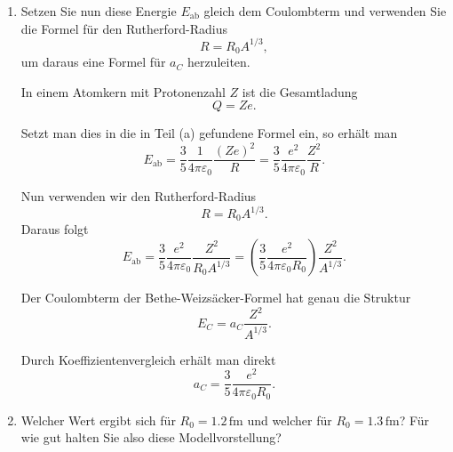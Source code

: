 \documentclass[11pt,a4paper]{scrartcl}
\begin{document}
\begin{enumerate}[label=(\alph*)]
\begin{solutionbox}
        Dies vereinfacht sich zu
        \[
            dE
            =\frac{1}{4\pi\varepsilon_0}\frac{3Q^2}{R^6}r^4\,dr.
        \]

        Nun integrieren wir von $r=0$ bis $r=R$:
        \[
            E_{\mathrm{ab}}
            =\int_0^R dE
            =\frac{3Q^2}{4\pi\varepsilon_0 R^6}\int_0^R r^4\,dr.
        \]

        Mit
        \[
            \int_0^R r^4\,dr=\frac{R^5}{5}
        \]
        erhält man
        \[
            E_{\mathrm{ab}}
            =\frac{3Q^2}{4\pi\varepsilon_0 R^6}\cdot \frac{R^5}{5}
            =\frac{3}{5}\frac{1}{4\pi\varepsilon_0}\frac{Q^2}{R}.
        \]
    \end{solutionbox}

    \item Setzen Sie nun diese Energie $E_{\mathrm{ab}}$ gleich dem Coulombterm und verwenden Sie die Formel für den Rutherford-Radius
    \[
        R=R_0A^{1/3},
    \]
    um daraus eine Formel für $a_C$ herzuleiten.

    \begin{solutionbox}
        In einem Atomkern mit Protonenzahl $Z$ ist die Gesamtladung
        \[
            Q=Ze.
        \]

        Setzt man dies in die in Teil (a) gefundene Formel ein, so erhält man
        \[
            E_{\mathrm{ab}}
            =\frac{3}{5}\frac{1}{4\pi\varepsilon_0}\frac{(Ze)^2}{R}
            =\frac{3}{5}\frac{e^2}{4\pi\varepsilon_0}\frac{Z^2}{R}.
        \]

        Nun verwenden wir den Rutherford-Radius
        \[
            R=R_0A^{1/3}.
        \]
        Daraus folgt
        \[
            E_{\mathrm{ab}}
            =\frac{3}{5}\frac{e^2}{4\pi\varepsilon_0}\frac{Z^2}{R_0A^{1/3}}
            =\left(\frac{3}{5}\frac{e^2}{4\pi\varepsilon_0R_0}\right)\frac{Z^2}{A^{1/3}}.
        \]

        Der Coulombterm der Bethe-Weizsäcker-Formel hat genau die Struktur
        \[
            E_C=a_C\frac{Z^2}{A^{1/3}}.
        \]

        Durch Koeffizientenvergleich erhält man direkt
        \[
            \boxed{
            a_C=\frac{3}{5}\frac{e^2}{4\pi\varepsilon_0R_0}
            }.
        \]
    \end{solutionbox}

    \item Welcher Wert ergibt sich für $R_0=1.2\,\mathrm{fm}$ und welcher für $R_0=1.3\,\mathrm{fm}$? Für wie gut halten Sie also diese Modellvorstellung?


\end{enumerate}
\end{document}
